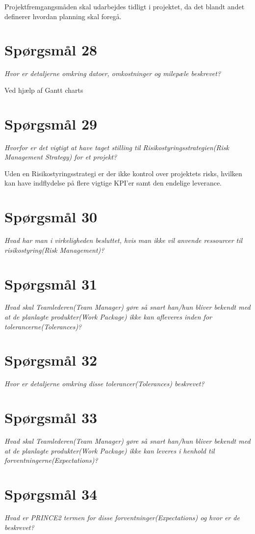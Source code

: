 Projektfremgangsmåden skal udarbejdes tidligt i projektet, da det blandt andet definerer hvordan planning skal foregå.

\section{Spørgsmål 28}
\textit{Hvor er detaljerne omkring datoer, omkostninger og milepæle beskrevet?}

Ved hjælp af Gantt charts

\section{Spørgsmål 29}
\textit{Hvorfor er det vigtigt at have taget stilling til Risikostyringsstrategien(Risk Management Strategy) for et projekt?}

Uden en Risikostyringsstrategi er der ikke kontrol over projektets risks, hvilken kan have indflydelse på flere vigtige KPI'er samt den endelige leverance.

\section{Spørgsmål 30}
\textit{Hvad har man i virkeligheden besluttet, hvis man ikke vil anvende ressourcer til risikostyring(Risk Management)?}

\section{Spørgsmål 31}
\textit{Hvad skal Teamlederen(Team Manager) gøre så snart han/hun bliver bekendt med at de planlagte produkter(Work Package) ikke kan afleveres inden for tolerancerne(Tolerances)?}

\section{Spørgsmål 32}
\textit{Hvor er detaljerne omkring disse tolerancer(Tolerances) beskrevet?}

\section{Spørgsmål 33}
\textit{Hvad skal Teamlederen(Team Manager) gøre så snart han/hun bliver bekendt med at de planlagte produkter(Work Package) ikke kan leveres i henhold til forventningerne(Expectations)?}

\section{Spørgsmål 34}
\textit{Hvad er PRINCE2 termen for disse forventninger(Expectations) og hvor er de beskrevet?}

